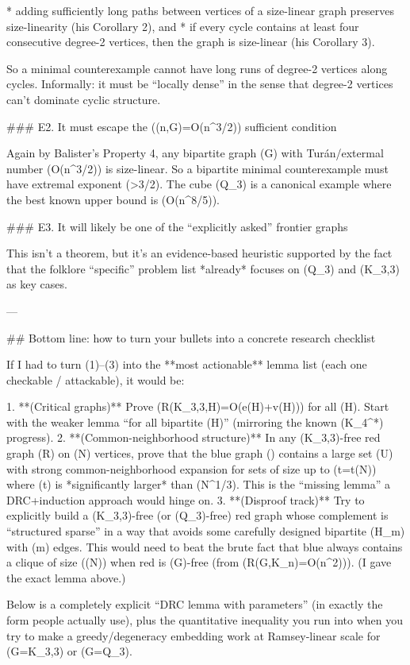 * adding sufficiently long paths between vertices of a size-linear graph preserves size-linearity (his Corollary 2), and
* if every cycle contains at least four consecutive degree-2 vertices, then the graph is size-linear (his Corollary 3).

So a minimal counterexample cannot have long runs of degree-2 vertices along cycles. Informally: it must be “locally dense” in the sense that degree-2 vertices can’t dominate cyclic structure.

### E2. It must escape the ((n,G)=O(n^{3/2})) sufficient condition

Again by Balister’s Property 4, any bipartite graph (G) with Turán/extermal number (O(n^{3/2})) is size-linear.
So a bipartite minimal counterexample must have extremal exponent (>3/2). The cube (Q_3) is a canonical example where the best known upper bound is (O(n^{8/5})).

### E3. It will likely be one of the “explicitly asked” frontier graphs

This isn’t a theorem, but it’s an evidence-based heuristic supported by the fact that the folklore “specific” problem list *already* focuses on (Q_3) and (K_{3,3}) as key cases.

---

## Bottom line: how to turn your bullets into a concrete research checklist

If I had to turn (1)–(3) into the **most actionable** lemma list (each one checkable / attackable), it would be:

1. **(Critical graphs)** Prove (R(K_{3,3},H)=O(e(H)+v(H))) for all (H).
   Start with the weaker lemma “for all bipartite (H)” (mirroring the known (K_4^*) progress).
2. **(Common-neighborhood structure)** In any (K_{3,3})-free red graph (R) on (N) vertices, prove that the blue graph () contains a large set (U) with strong common-neighborhood expansion for sets of size up to (t=t(N)) where (t) is *significantly larger* than (N^{1/3}). This is the “missing lemma” a DRC+induction approach would hinge on.
3. **(Disproof track)** Try to explicitly build a (K_{3,3})-free (or (Q_3)-free) red graph whose complement is “structured sparse” in a way that avoids some carefully designed bipartite (H_m) with (m) edges. This would need to beat the brute fact that blue always contains a clique of size (\Omega(\sqrt N)) when red is (G)-free (from (R(G,K_n)=O(n^2))). (I gave the exact lemma above.)

Below is a completely explicit “DRC lemma with parameters” (in exactly the form people actually use), plus the quantitative inequality you run into when you try to make a greedy/degeneracy embedding work at Ramsey‑linear scale for (G=K_{3,3}) or (G=Q_3).

